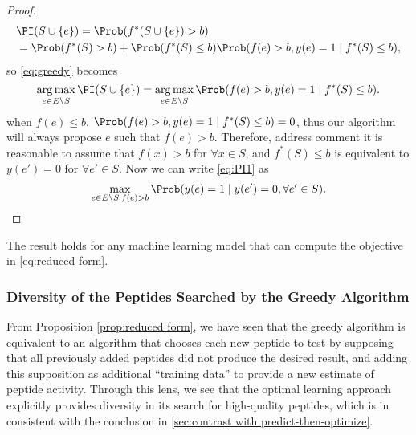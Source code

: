 \begin{proof}
  \begin{equation*}
    \begin{split}
      &\PI(S \cup \{e\}) = \Prob(f^*(S\cup \{e\}) > b)\\
      &= \Prob(f^*(S) > b) + \Prob(f^*(S)\leq b) \Prob(f(e) > b, y(e) = 1 \mid f^*(S)\leq b),
    \end{split}
  \end{equation*}
  so \eqref{eq:greedy} becomes
  \begin{equation} \label{eq:PI1} 
    \underset{e \in E \backslash S}{\arg\max} \, \PI(S \cup \{e\}) = \underset{e \in E \backslash S}{\arg\max} \, \Prob(f(e) > b, y(e)=1 \mid f^*(S)\leq b).
  \end{equation}
  when $f(e) \leq b$, $\Prob(f(e) > b, y(e) = 1 \mid f^*(S)\leq b) = 0$, thus our algorithm will always propose $e$ such that $f(e) > b$. Therefore, {address comment} it is reasonable to assume that $f(x) > b$ for $\forall x \in S$, and $f^*(S)\leq b$ is equivalent to $y(e') = 0$ for $\forall e' \in S$. Now we can write \eqref{eq:PI1} as 
  \begin{equation*}
    \underset{e \in E \backslash S, f(e) > b}{\max} \, \Prob (y(e) = 1 \mid y(e') = 0, \forall e' \in S). 
  \end{equation*}
\end{proof}

The result holds for any machine learning model that can compute the objective in \eqref{eq:reduced form}.

\subsubsection{Diversity of the Peptides Searched by the Greedy Algorithm} \label{sec:intuition}
From Proposition \ref{prop:reduced form}, we have seen that the greedy algorithm is equivalent to an algorithm that chooses each new peptide to test by supposing that all previously added peptides did not produce the desired result, and adding this supposition as additional \enquote{training data} to provide a new estimate of peptide activity. Through this lens, we see that the optimal learning approach explicitly provides diversity in its search for high-quality peptides, which is in consistent with the conclusion in \ref{sec:contrast with predict-then-optimize}. 


